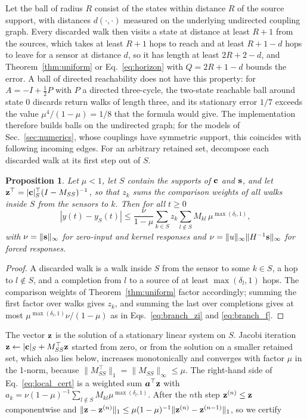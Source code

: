 \documentclass[aps,pra,superscriptaddress,floatfix,longbibliography,twocolumn]{revtex4-2}
\newcommand{\bc}{{\bf c}}
\newcommand{\bs}{{\bf s}}
\newcommand{\bz}{{\bf z}}
\newtheorem{proposition}{Proposition}
\begin{document}
Let the ball of radius $R$ consist of the states within distance $R$ of the source support, with distances $d(\cdot,\cdot)$ measured on the underlying undirected coupling graph. Every discarded walk then visits a state at distance at least $R+1$ from the sources, which takes at least $R+1$ hops to reach and at least $R+1-d$ hops to leave for a sensor at distance $d$, so it has length at least $2R+2-d$, and Theorem~\ref{thm:uniform} or Eq.~\eqref{eq:horizon} with $Q=2R+1-d$ bounds the error. A ball of directed reachability does not have this property: for $A=-I+\tfrac12P$ with $P$ a directed three-cycle, the two-state reachable ball around state 0 discards return walks of length three, and its stationary error $1/7$ exceeds the value $\mu^4/(1-\mu)=1/8$ that the formula would give. The implementation therefore builds balls on the undirected graph; for the models of Sec.~\ref{sec:numerics}, whose couplings have symmetric support, this coincides with following incoming edges. For an arbitrary retained set, decompose each discarded walk at its first step out of $S$.
\begin{proposition}\label{prop:local}
Let $\mu<1$, let $S$ contain the supports of $\bc$ and $\bs$, and let $\bz^\top=|\bc|_S^\top(I-M_{SS})^{-1}$, so that $z_k$ sums the comparison weights of all walks inside $S$ from the sensors to $k$. Then for all $t\ge0$
\begin{equation}\label{eq:local_cert}
|y(t)-y_S(t)|\le\frac{\nu}{1-\mu}\sum_{k\in S}z_k\sum_{l\notin S}M_{kl}\,\mu^{\max(\delta_l,1)},
\end{equation}
with $\nu=\|\bs\|_\infty$ for zero-input and kernel responses and $\nu=\|u\|_\infty\|H^{-1}\bs\|_\infty$ for forced responses.
\end{proposition}
\begin{proof}
A discarded walk is a walk inside $S$ from the sensor to some $k\in S$, a hop to $l\notin S$, and a completion from $l$ to a source of at least $\max(\delta_l,1)$ hops. The comparison weights of Theorem~\ref{thm:uniform} factor accordingly; summing the first factor over walks gives $z_k$, and summing the last over completions gives at most $\mu^{\max(\delta_l,1)}\nu/(1-\mu)$ as in Eqs.~\eqref{eq:branch_zi} and \eqref{eq:branch_f}.
\end{proof}
The vector $\bz$ is the solution of a stationary linear system on $S$. Jacobi iteration $\bz\leftarrow|\bc|_S+M_{SS}^\top\bz$ started from zero, or from the solution on a smaller retained set, which also lies below, increases monotonically and converges with factor $\mu$ in the 1-norm, because $\|M_{SS}^\top\|_1=\|M_{SS}\|_\infty\le\mu$. The right-hand side of Eq.~\eqref{eq:local_cert} is a weighted sum $\bm{a}^\top\bz$ with $a_k=\nu(1-\mu)^{-1}\sum_{l\notin S}M_{kl}\mu^{\max(\delta_l,1)}$. After the $n$th step $\bz^{(n)}\le\bz$ componentwise and $\|\bz-\bz^{(n)}\|_1\le\mu(1-\mu)^{-1}\|\bz^{(n)}-\bz^{(n-1)}\|_1$, so we certify
\end{document}
